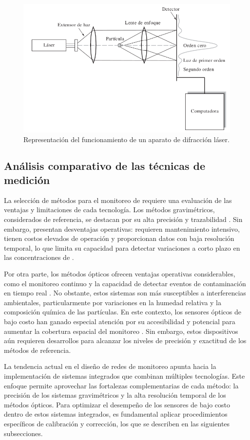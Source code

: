 \begin{figure}[tph!]
	\centering
	\includegraphics[width=0.8\linewidth]{Figures/difraccionLaser}
	\caption{Representación del funcionamiento de un aparato de difracción láser.}
	\label{fig:difraccionlaser}
\end{figure}


\subsection{Análisis comparativo de las técnicas de medición}

La selección de métodos para el monitoreo de \MPF requiere una evaluación de las ventajas y limitaciones de cada tecnología. Los métodos gravimétricos, considerados de referencia, se destacan por su alta precisión y trazabilidad \citep{EPA1998}. Sin embargo, presentan desventajas operativas: requieren mantenimiento intensivo, tienen costos elevados de operación y proporcionan datos con baja resolución temporal, lo que limita su capacidad para detectar variaciones a corto plazo en las concentraciones de \MPF.


Por otra parte, los métodos ópticos ofrecen ventajas operativas considerables, como el monitoreo continuo y la capacidad de detectar eventos de contaminación en tiempo real \cite{KUMAR2015199}. No obstante, estos sistemas son más susceptibles a interferencias ambientales, particularmente por variaciones en la humedad relativa y la composición química de las partículas. En este contexto, los sensores ópticos de bajo costo han ganado especial atención por su accesibilidad y potencial para aumentar la cobertura espacial del monitoreo \citep{Nalakurthi2024}. Sin embargo, estos dispositivos aún requieren desarrollos  para alcanzar los niveles de precisión y exactitud de los métodos de referencia.

La tendencia actual en el diseño de redes de monitoreo apunta hacia la implementación de sistemas integrados que combinan múltiples tecnologías. Este enfoque permite aprovechar las fortalezas complementarias de cada método: la precisión de los sistemas gravimétricos y la alta resolución temporal de los métodos ópticos. Para optimizar el desempeño de los sensores de bajo costo dentro de estos sistemas integrados, es fundamental aplicar procedimientos específicos de calibración y corrección, los que se describen en las siguientes subsecciones.  



